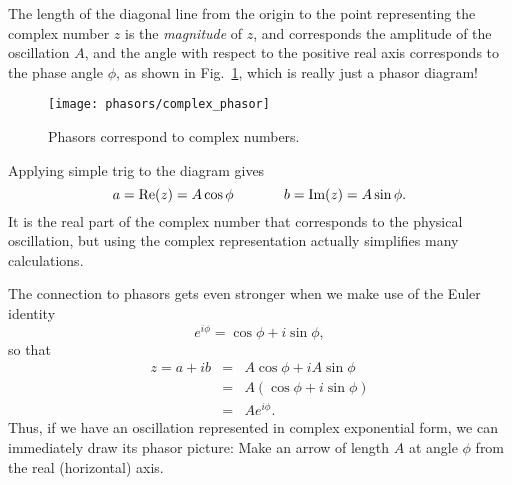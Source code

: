 The length of the diagonal line from the origin to the point representing
the complex number $z$ is the \textit{magnitude} of $z$, and corresponds
the amplitude of the oscillation $A$, and the angle with respect to the 
positive real axis corresponds to the phase angle $\phi$, as shown in 
Fig.~\ref{fig:complexPhasor}, which is really just a phasor diagram!
\begin{figure}[b]
\begin{center}
\texttt{[image: phasors/complex\_phasor]}  
\caption{\label{fig:complexPhasor}Phasors correspond to complex numbers.}
\end{center}
\end{figure}

Applying simple trig to the diagram gives 
\begin{equation}
a = \mbox{Re}(z) = A \cos\phi\hspace{0.5in}b = \mbox{Im}(z) = A\sin\phi.
\end{equation} 
It is the real part of the complex number that corresponds to the 
physical oscillation,  but using the complex representation actually 
simplifies many calculations.  

The connection to phasors gets even stronger when we make use of the 
Euler identity
\begin{equation}
e^{i\phi} = \cos\phi + i\sin\phi,
\label{eq:euler}
\end{equation}
so that
\begin{eqnarray}
z = a + ib &=& A\cos\phi + i A\sin\phi \nonumber \\
	   &=& A(\cos\phi + i\sin\phi)  \nonumber \\
  	   &=& Ae^{i\phi}.
\end{eqnarray}
Thus, if we have an oscillation represented in complex exponential form,
we can immediately draw its phasor picture:  Make an arrow of length
$A$ at angle $\phi$ from the real (horizontal) axis.

